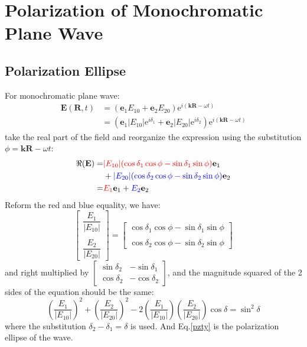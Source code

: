 \documentclass[11pt,a4paper,oneside]{book}
\begin{document}
\section{Polarization of Monochromatic Plane Wave}
\subsection{Polarization Ellipse}
For monochromatic plane wave:\begin{equation}
	\begin{aligned}
		\mathbf{E}(\mathbf{R},t)&=(\mathbf{e}_1E_{10}+\mathbf{e}_2E_{20})\text{e}^{i(\mathbf{k}\mathbf{R}-\omega t)}\\
		&=(\mathbf{e}_1|E_{10}|\text{e}^{i\delta_1}+\mathbf{e}_2|E_{20}|\text{e}^{i\delta_2})\text{e}^{i(\mathbf{k}\mathbf{R}-\omega t)}
	\end{aligned}
\end{equation}
take the real part of the field and reorganize the expression using the substitution $\phi=\mathbf{k}\mathbf{R}-\omega t$:
\begin{equation}
	\begin{aligned}
		\Re(\mathbf{E})=&\textcolor{red}{|E_{10}|(\cos\delta_1\cos\phi-\sin\delta_1\sin\phi)}\mathbf{e}_1 \\
		&+\textcolor{blue}{|E_{20}|(\cos\delta_2\cos\phi-\sin\delta_2\sin\phi)}\mathbf{e}_2\\
		=&\textcolor{red}{E_1}\mathbf{e}_1+\textcolor{blue}{E_2}\mathbf{e}_2
	\end{aligned}
\end{equation}
Reform the red and blue equality, we have:
\begin{equation}
	\begin{bmatrix}
		\dfrac{E_1}{|E_{10}|}\\ \\
		\dfrac{E_2}{|E_{20}|}
	\end{bmatrix}
	=\begin{bmatrix}
		\cos\delta_1\cos\phi-\sin\delta_1\sin\phi\\
		\\
		\cos\delta_2\cos\phi-\sin\delta_2\sin\phi
	\end{bmatrix}
\end{equation}
and right multiplied by $\displaystyle{\begin{bmatrix} \sin\delta_2 & -\sin\delta_1 \\ \cos\delta_2 & -\cos\delta_2 \end{bmatrix}}$, and the magnitude squared of the 2 sides of the equation should be the same:
\begin{equation}\label{pzty}
	\left( \dfrac{E_1}{|E_{10}|}\right)^2 +\left( \dfrac{E_2}{|E_{20}|}\right)^2-2\left( \dfrac{E_1}{|E_{10}|}\right)\left( \dfrac{E_2}{|E_{20}|}\right)\cos\delta=\sin^2\delta
\end{equation}
where the substitution $\delta_2-\delta_1=\delta$ is used. And Eq.\ref{pzty} is the polarization ellipse of the wave.
\end{document}
